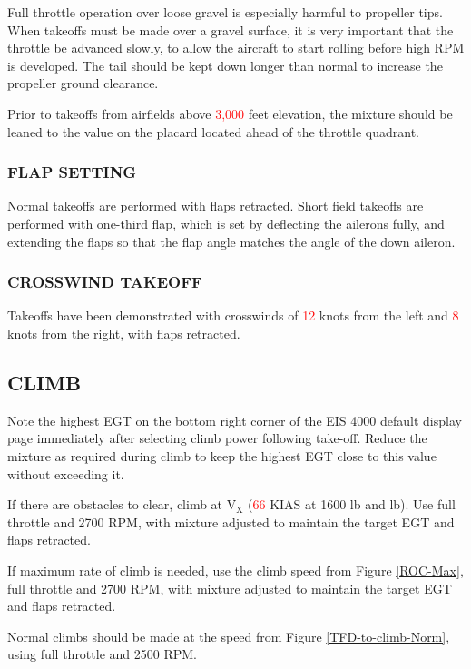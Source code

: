     Full throttle operation over loose gravel is especially harmful to propeller tips. When takeoffs must be made over a gravel surface, it is very important that the throttle be advanced slowly, to allow the aircraft to start rolling before high RPM is developed. The tail should be kept down longer than normal to increase the propeller ground clearance.
    
    Prior to takeoffs from airfields above \textcolor{red}{3,000} feet elevation, the mixture should be leaned to the value on the placard located ahead of the throttle quadrant.
    
  \subsubsection{FLAP SETTING}
    Normal takeoffs are performed with flaps retracted. Short field takeoffs are performed with one-third flap, which is set by deflecting the ailerons fully, and extending the flaps so that the flap angle matches the angle of the down aileron.
    
  \subsubsection{CROSSWIND TAKEOFF}
    Takeoffs have been demonstrated with crosswinds of \textcolor{red}{12} knots from the left and \textcolor{red}{8} knots from the right, with flaps retracted. 

\subsection{CLIMB}
Note the highest EGT on the bottom right corner of the EIS 4000 default display page immediately after selecting climb power following take-off. Reduce the mixture as required during climb to keep the highest EGT close to this value without exceeding it.

If there are obstacles to clear, climb at $\mathrm{V_{X}}$ (\textcolor{red}{66} KIAS at 1600 lb and  lb). Use full throttle and 2700 RPM, with mixture adjusted to maintain the target EGT and flaps retracted.

If maximum rate of climb is needed, use the climb speed from Figure \ref{ROC-Max}, full throttle and 2700 RPM, with mixture adjusted to maintain the target EGT and flaps retracted.

Normal climbs should be made at the speed from Figure \ref{TFD-to-climb-Norm}, using full throttle and 2500 RPM.
